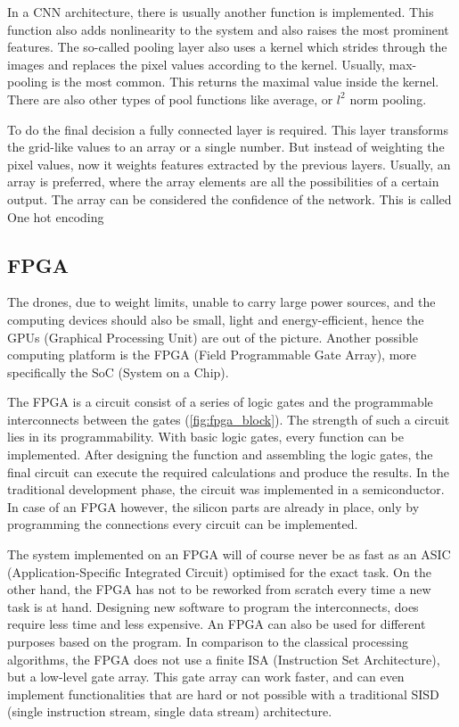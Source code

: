 In a CNN architecture, there is usually another function is implemented.
This function also adds nonlinearity to the system and also raises the most prominent features.
The so-called pooling layer also uses a kernel which strides through the images and replaces the pixel values according to the kernel.
Usually, max-pooling is the most common.
This returns the maximal value inside the kernel.
There are also other types of pool functions like average, or $l^2$ norm pooling.

To do the final decision a fully connected layer is required.
This layer transforms the grid-like values to an array or a single number.
But instead of weighting the pixel values, now it weights features extracted by the previous layers.
Usually, an array is preferred, where the array elements are all the possibilities of a certain output.
The array can be considered the confidence of the network.
This is called One hot encoding

\subsection{FPGA} %
The drones, due to weight limits, unable to carry large power sources, and the computing devices should also be small, light and energy-efficient, hence the GPUs (Graphical Processing Unit) are out of the picture.
Another possible computing platform is the FPGA (Field Programmable Gate Array), more specifically the SoC (System on a Chip).

The FPGA is a circuit consist of a series of logic gates and the programmable interconnects between the gates (\cref{fig:fpga_block}).
The strength of such a circuit lies in its programmability.
With basic logic gates, every function can be implemented.
After designing the function and assembling the logic gates, the final circuit can execute the required calculations and produce the results.
In the traditional development phase, the circuit was implemented in a semiconductor.
In case of an FPGA however, the silicon parts are already in place, only by programming the connections every circuit can be implemented.

The system implemented on an FPGA will of course never be as fast as an ASIC (Application-Specific Integrated Circuit) optimised for the exact task.
On the other hand, the FPGA has not to be reworked from scratch every time a new task is at hand.
Designing new software to program the interconnects, does require less time and less expensive.
An FPGA can also be used for different purposes based on the program.
In comparison to the classical processing algorithms, the FPGA does not use a finite ISA (Instruction Set Architecture), but a low-level gate array.
This gate array can work faster, and can even implement functionalities that are hard or not possible with a traditional SISD (single instruction stream, single data stream) architecture.

